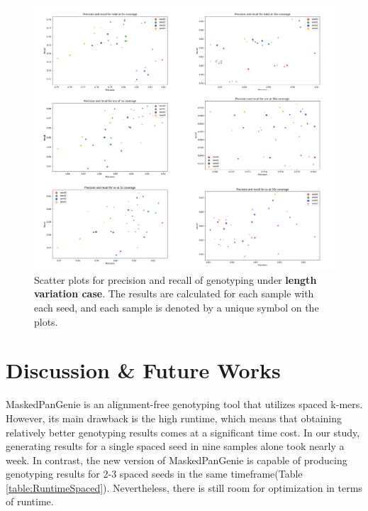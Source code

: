 \documentclass{PHlab-thesis}
\begin{document}
\begin{figure}[ht!]
	\centering
	\includegraphics[scale=0.3]{figures/len_genotyping.png}
	\caption{Scatter plots for precision and recall of genotyping under \textbf{length variation case}. The results are calculated for each sample with each seed, and each sample is denoted by a unique symbol on the plots.}
	\label{fig:len_genotyping} %
\end{figure}
\chapter{Discussion \& Future Works}
MaskedPanGenie is an alignment-free genotyping tool that utilizes spaced k-mers. However, its main drawback is the high runtime, which means that obtaining relatively better genotyping results comes at a significant time cost. In our study, generating results for a single spaced seed in nine samples alone took nearly a week. In contrast, the new version of MaskedPanGenie is capable of producing genotyping results for 2-3 spaced seeds in the same timeframe(Table \ref{table:RuntimeSpaced}). Nevertheless, there is still room for optimization in terms of runtime.
\end{document}
